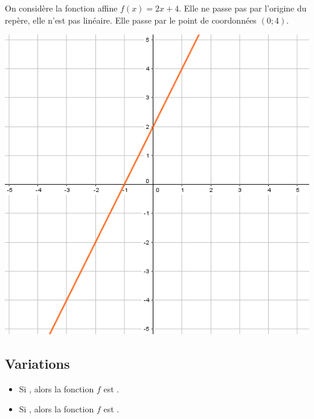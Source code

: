 \documentclass[12pt,a4paper]{article}
\begin{document}
	\begin{myex}
		\begin{multicols}{2}
			\vspace*{1.5cm}
			On considère la fonction affine $f(x)=2x+4$. Elle ne passe pas par l'origine du repère, elle n'est pas linéaire. Elle passe par le point de coordonnées $(0;4)$.
			
			\includegraphics[scale=0.5]{img/ex1}
		\end{multicols}
	\end{myex}

	\subsection{Variations}
	
	\begin{myprops}
		\begin{itemize}
			\item Si , alors la fonction $f$ est .
			\item Si , alors la fonction $f$ est .
		\end{itemize}
	\end{myprops}
\end{document}
